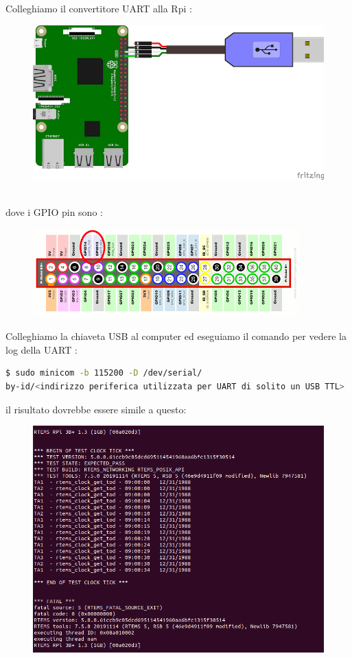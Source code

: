 \documentclass[10pt, a4paper]{article}
\begin{document}
\begin{flushleft}
Colleghiamo il convertitore UART alla Rpi :
\begin{figure}[h!]
\includegraphics[width=\linewidth]{rpi-uart-usb.png}
\end{figure}
\\
dove i GPIO pin sono :
\begin{figure}[h!]
\includegraphics[width=\linewidth]{rpi-gpio.png}
\end{figure}

\newpage
Colleghiamo la chiaveta USB al computer ed eseguiamo il comando per vedere la log della UART :
\begin{lstlisting}[language=bash] 
$ sudo minicom -b 115200 -D /dev/serial/
by-id/<indirizzo periferica utilizzata per UART di solito un USB TTL>
\end{lstlisting}

il risultato dovrebbe essere simile a questo:
\begin{figure}[h!]
\includegraphics[width=\linewidth]{risultato-ticker.png}
\end{figure}


\end{flushleft}
\end{document}
